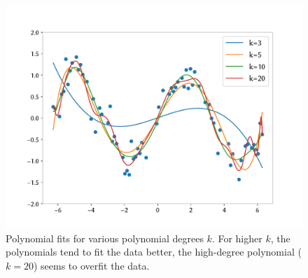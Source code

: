 \begin{answer}
\begin{figure}[h]
\centering
\includegraphics*[width=.7\linewidth]{../src/featuremaps/part_c.pdf}
\caption{Polynomial fits for various polynomial degrees $k$. For higher $k$, the polynomials tend to fit the data better, the high-degree polynomial ($k=20$) seems to overfit the data.}        
\end{figure}
\end{answer}
